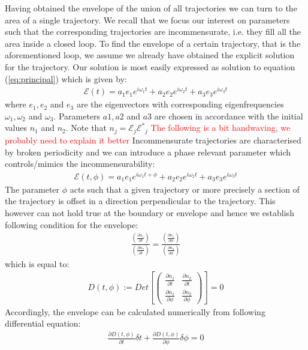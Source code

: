 \documentclass[9pt,twocolumn,twoside]{osajnl}
\begin{document}
Having obtained the envelope of the union of all trajectories we 
can turn to the area of a single trajectory. We recall that we 
focus our interest on parameters such that the corresponding 
trajectories are incommensurate, i.e. they fill all the area inside
a closed loop. To find the envelope of a certain trajectory, that 
is the aforementioned loop, we assume we
already have obtained 
the explicit solution for the trajectory.
Our solution is most easily expressed as 
solution to equation (\ref{eq:principal}) which is given by:
\begin{eqnarray}
\mathcal{E}(t) = a_1 e_1 e^{i \omega_1 t} + a_2 e_2 e^{i \omega_2 t} +a_3 e_3 e^{i \omega_3 t} 
\end{eqnarray}
where $e_1,e_2$ and $e_3$ are the eigenvectors with corresponding eigenfrequencies $\omega_1, \omega_2$ and $\omega_3$. Parameters $a1, a2$ and $ a3$ are chosen in accordance with the initial values $n_1$ and $n_2$. Note 
that $n_j = \mathcal{E}_j\mathcal{E^*}_j$
\textcolor{red}{The following is a bit handwaving, we probably need to explain it better}
Incommensurate trajectories are 
characterised by broken periodicity and 
we can introduce a phase relevant parameter which controls/mimics the incommensurability: 
\begin{eqnarray}
\mathcal{E}(t, \phi) = a_1 e_1 e^{i \omega_1 t + \phi} + a_2 e_2 e^{i \omega_2 t} +a_3 e_3 e^{i \omega_3 t} 
\end{eqnarray}
The parameter $\phi$ acts such that 
a given trajectory or more precisely a section of the trajectory is offset in a
direction perpendicular to the trajectory.
This however can not hold true at the 
boundary or envelope and hence we establish
following condition for the envelope:
\begin{eqnarray}
\frac{ (\frac{\partial n_1}{\partial t}) }{ (\frac{\partial n_2}{\partial t}) } = \frac{( \frac{\partial n_1}{\partial \phi})}{(\frac{\partial n_2}{\partial \phi}) } 	
\end{eqnarray}
which is equal to:
\begin{eqnarray}
D(t, \phi):=Det[\left(  \begin{array}{cc} 
\frac{\partial n_1}{\partial t} & \frac{\partial n_2}{\partial t} \\
\frac{\partial n_1}{\partial \phi} & \frac{\partial n_2}{\partial \phi} 
\end{array} \right)] = 0
\end{eqnarray}
Accordingly, the envelope can be calculated numerically
 from following differential equation:
\begin{eqnarray}
\frac{\partial D(t,\phi)}{\partial t} \delta t +
\frac{\partial D(t,\phi)}{\partial \phi} \delta \phi = 0
\end{eqnarray}
\end{document}
